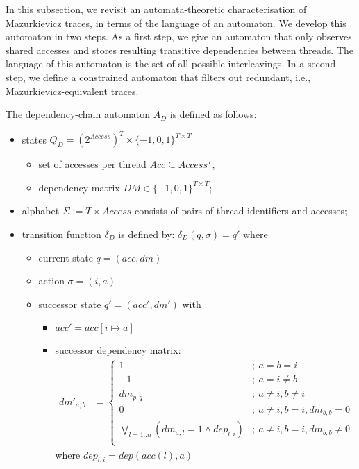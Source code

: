 \documentclass[envcountsame]{llncs}%
\begin{document}
In this subsection, we revisit an automata-theoretic characterisation
of Mazurkievicz traces, in terms of the language of an automaton.
%
We develop this automaton in two steps.
As a first step, we give an automaton that only observes
shared accesses and stores resulting transitive dependencies
between threads.
The language of this automaton is the set of all possible interleavings.
%
In a second step, we define a constrained automaton that 
filters out redundant, i.e., Mazurkievicz-equivalent traces.
%
\begin{definition}

The dependency-chain automaton $A_D$ is defined as follows:
%
\begin{itemize}

  \item states $Q_D= ({2^{Access}})^T \times \{-1,0,1\}^{T\times T}$
  \begin{itemize}
    \item set of accesses per thread $Acc \subseteq Access^T$,
    \item dependency matrix $DM \in \{-1,0,1\}^{T\times T}$;
  \end{itemize}
  \item alphabet $\Sigma:= T\times Access$ consists of pairs
  of thread identifiers and accesses;
  \item transition function $\delta_D$ is defined by:
  $\delta_D(q, \sigma) = q'$ where
  \begin{itemize}
    \item current state $q=(acc, dm)$
    \item action $\sigma=(i, a)$
    \item successor state $q'=(acc', dm')$ with
    \begin{itemize}
      \item $acc'=acc[i\mapsto a]$ 
      \item successor dependency matrix:
      \begin{align*}
       {dm'}_{a,b} & =
       \begin{cases}
       1                                                        & ;\  a=b=i\\
       -1                                                       & ;\ a=i\neq b \\
       dm_{p,q}                                                 & ;\ a\neq i, b\neq i \\
       0                                                        & ;\ a\neq i, b=i, dm_{b,b}=0\\
       \bigvee_{l=1..n} \left (dm_{a,l}=1 \wedge dep_{l,i} \right) & ;\ a\neq i, b=i, dm_{b,b}\neq 0\\
       \end{cases}
      \end{align*}
      where $dep_{l,i}= dep(acc(l), a)$
    \end{itemize}
  \end{itemize}
\end{itemize}
\end{definition}
\end{document}
